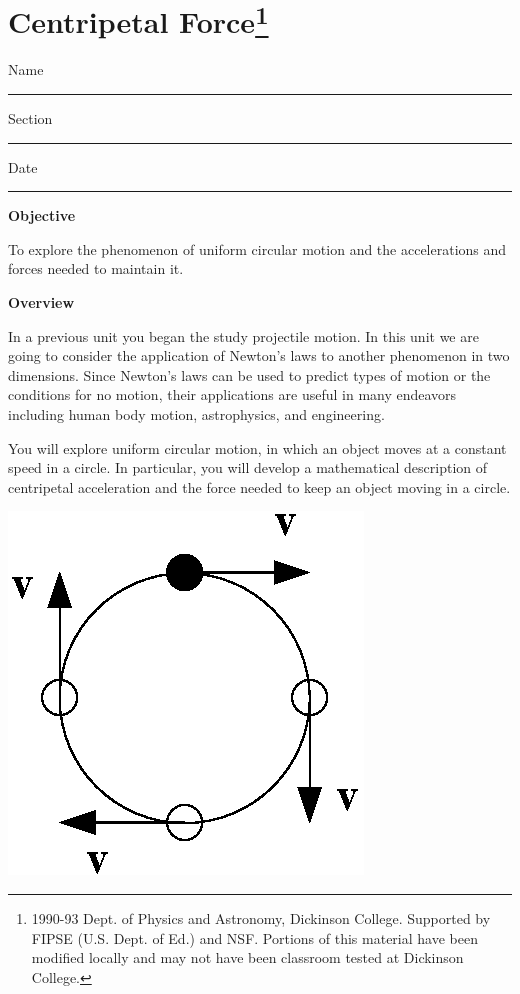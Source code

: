 \section{Centripetal Force\footnote{
1990-93 Dept. of Physics and Astronomy, Dickinson College. Supported by FIPSE
(U.S. Dept. of Ed.) and NSF. Portions of this material have been modified locally
and may not have been classroom tested at Dickinson College.
}}

Name \rule{2.0in}{0.1pt}\hfill{}Section \rule{1.0in}{0.1pt}\hfill{}Date \rule{1.0in}{0.1pt}

\textbf{Objective} 

To explore the phenomenon of uniform circular motion and the accelerations and
forces needed to maintain it.

\textbf{Overview} 

In a previous unit you began the study 
projectile motion. In this unit we are going to consider the application of
Newton's laws to another phenomenon in two dimensions. Since Newton's laws can
be used to predict types of motion or the conditions for no motion, their applications
are useful in many endeavors including human body motion, astrophysics, and
engineering.

You will explore uniform circular motion, in which an object moves at a constant
speed in a circle. In particular, you will develop a mathematical description
of centripetal acceleration and the force needed to keep an object moving in
a circle.

\vspace{0.3cm}
{\par\centering \includegraphics{iqsCentripetalForce/centripetal_fig1b.eps} \par}
\vspace{0.3cm}

